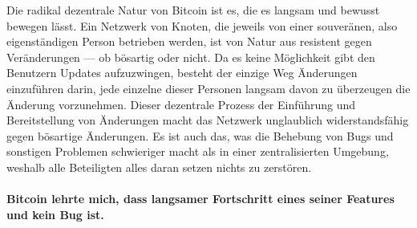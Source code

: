 Die radikal dezentrale Natur von Bitcoin ist es, die es langsam und bewusst
bewegen lässt. Ein Netzwerk von Knoten, die jeweils von einer souveränen, also
eigenständigen Person betrieben werden, ist von Natur aus resistent gegen
Veränderungen — ob bösartig oder nicht. Da es keine Möglichkeit gibt den
Benutzern Updates aufzuzwingen, besteht der einzige Weg Änderungen einzuführen
darin, jede einzelne dieser Personen langsam davon zu überzeugen die Änderung
vorzunehmen. Dieser dezentrale Prozess der Einführung und Bereitstellung von
Änderungen macht das Netzwerk unglaublich widerstandsfähig gegen bösartige
Änderungen. Es ist auch das, was die Behebung von Bugs und sonstigen Problemen
schwieriger macht als in einer zentralisierten Umgebung, weshalb alle
Beteiligten alles daran setzen nichts zu zerstören.

\paragraph{Bitcoin lehrte mich, dass langsamer Fortschritt eines seiner Features
und kein Bug ist.}

%
%
%
%
%
%
%
